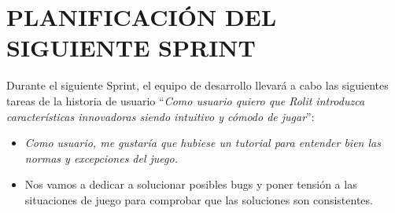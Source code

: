 \documentclass{article}
\begin{document}
\section{PLANIFICACIÓN DEL SIGUIENTE SPRINT}
Durante el siguiente Sprint, el equipo de desarrollo llevará a cabo las siguientes tareas de la historia de usuario ``\textit{Como usuario quiero que Rolit introduzca características innovadoras siendo intuitivo y cómodo de jugar}'':
\begin{itemize}
\item \textit{Como usuario, me gustaría que hubiese un tutorial para entender bien las normas y excepciones del juego.}
\item Nos vamos a dedicar a solucionar posibles bugs y poner tensión a las situaciones de juego para comprobar que las soluciones son consistentes.
\end{itemize}
\end{document}
